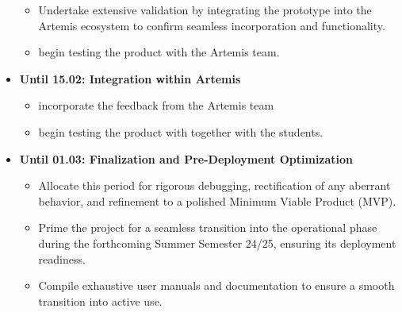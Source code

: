 \documentclass[a4paper,12pt,twoside]{article}
\begin{document}
\begin{itemize}
    \begin{itemize}
        \item Undertake extensive validation by integrating the prototype into the Artemis ecosystem to confirm seamless incorporation and functionality.
        \item begin testing the product with the Artemis team.
    \end{itemize}
    \item \textbf{Until 15.02: Integration within Artemis }
    \begin{itemize}
        \item incorporate the feedback from the Artemis team
        \item begin testing the product with together with the students.
    \end{itemize}
    \item \textbf{Until 01.03: Finalization and Pre-Deployment Optimization }
    \begin{itemize}
        \item Allocate this period for rigorous debugging, rectification of any aberrant behavior, and refinement to a polished Minimum Viable Product (MVP).
        \item Prime the project for a seamless transition into the operational phase during the forthcoming Summer Semester 24/25, ensuring its deployment readiness.
        \item Compile exhaustive user manuals and documentation to ensure a smooth transition into active use.
    \end{itemize}
\end{itemize}

\clearpage

\clearpage



\end{document}

